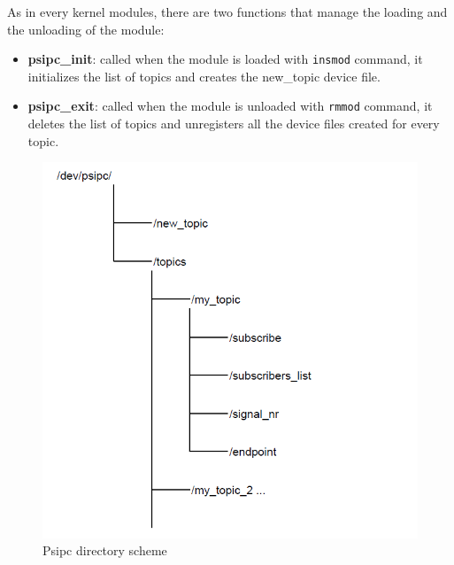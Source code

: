 \documentclass[10pt,a4]{article}
\newcommand{\code}[1]{\texttt{#1}}
\begin{document}
As in every kernel modules, there are two functions that manage the loading and the unloading of the module:

\begin{itemize}
  \item \textbf{psipc\_init}: called when the module is loaded with \code{insmod} command, it initializes the list of topics and creates the new\_topic device file.
  \item \textbf{psipc\_exit}: called when the module is unloaded with \code{rmmod} command, it deletes the list of topics and unregisters all the device files created for every topic.
\end{itemize}

\begin{center}
  \begin{figure}[H]
      \includegraphics[scale=0.50, center]{assets/psipc_scheme.png}
      \caption{Psipc directory scheme}
      \label{fig: psipc_scheme}
  \end{figure}
\end{center}
\end{document}
